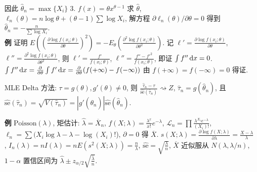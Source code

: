 \documentclass[a4paper, landscape,10pt]{article}
\begin{document}
\begin{multicols}{4}
\begin{scriptsize}
因此 $\hat \theta_n = \max \{X_i\}$
3. $f(x) = \theta x ^ {\theta - 1}$ 求 $\hat \theta$, $\ell_n(\theta) = n \log \theta + (\theta - 1) \sum \log X_i$, 
解方程 $\partial \ell_n(\theta) / \partial \theta = 0$ 得到
$\hat \theta_n = - \frac{n}{\sum \log X_i}$.\\
{\bfseries 例} 证明 $E((\frac{\partial \log f(x_i;\theta)}{\partial \theta})^2) = -E_\theta(\frac {\partial^2 \log f(x_i;\theta)}{\partial \theta^2})$.
记 $\ell' = \frac{\partial \log f(x_i;\theta)}{\partial \theta}$, $\ell'' = \frac{\partial^2 \log f(x_i;\theta)}{\partial \theta^2}$,
则 $\ell' = \frac{f'}{f(x_i; \theta)}$, $\ell'' = \frac{f'' - f'^2}{f(x_i; \theta)}$, 即证 $\int f'' \,\mathrm{d} x = 0$.
$\int f'' \,\mathrm{d} x = 
\frac{\partial} {\partial \theta} \int f' \,\mathrm{d} x = \frac{\partial} {\partial \theta} (f(+\infty)-f(-\infty))$ 由 $f(+\infty) = f(-\infty) = 0$ 得证.\\
\end{scriptsize}
MLE Delta 方法: $\tau = g(\theta), g'(\theta) \neq 0$, 则 $\frac {\hat \tau_n - \tau} {\hat {\mathrm{se}}(\hat \tau_n)} \rightsquigarrow Z$,
$\hat \tau_n = g(\hat \theta_n)$, 且 $\hat {\mathrm{se}}(\hat \tau_n) = \sqrt{V(\hat \tau_n)} = |g'(\hat \theta_n)| \hat {\mathrm{se}}(\hat \theta_n)$. \\
\begin{scriptsize}
{\bfseries 例} $\mathrm{Poisson}(\lambda)$, 矩估计: $\hat \lambda = \overline X_n$,
$f(X; \lambda) = \frac{\lambda^x}{x!} e^{-\lambda}$,
$\mathcal{L}_n = \prod \frac{\lambda^{X_i}e^{-\lambda}}{(X_i)!}$, $\ell_n = \sum (X_i \log \lambda - \lambda - \log (X_i)!$), $\partial = 0$ 得 $\overline X$.
$s(X; \lambda) = \frac{\partial \log f(X; \lambda)}{\partial \lambda} = \frac{X - \lambda}{\lambda}$,
$I_n(\lambda) = n I(\lambda) = n E(s^2(X; \lambda)) = \frac{n}{\lambda}$, $\hat {\mathrm{se}} = \sqrt{\frac{\lambda}{n}}$, 
$\overline X$ 近似服从 $N(\lambda, \lambda / n)$,
$1 - \alpha$ 置信区间为 $\hat \lambda \pm z_{\alpha/2} \sqrt{\frac {\hat \lambda} {n}}$. \\
	
\newcolumn


\end{scriptsize}
\end{multicols}
\end{document}
